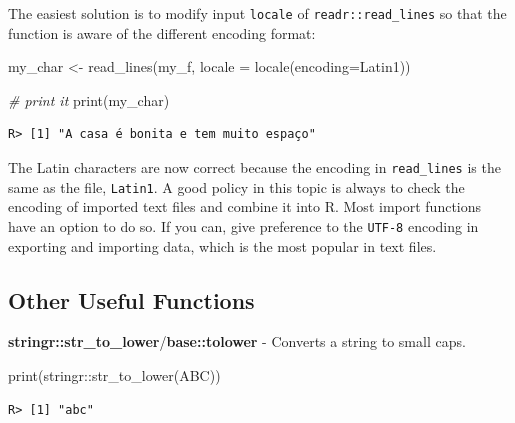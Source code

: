 \documentclass[
  12pt,
]{book}
\newenvironment{Shaded}{\begin{snugshade}}{\end{snugshade}}
\newcommand{\AttributeTok}[1]{\textcolor[rgb]{0.61,0.61,0.61}{#1}}
\newcommand{\CommentTok}[1]{\textcolor[rgb]{0.37,0.37,0.37}{\textit{#1}}}
\newcommand{\FunctionTok}[1]{\textcolor[rgb]{0,0,0}{#1}}
\newcommand{\NormalTok}[1]{#1}
\newcommand{\OtherTok}[1]{\textcolor[rgb]{0.37,0.37,0.37}{#1}}
\newcommand{\SpecialCharTok}[1]{\textcolor[rgb]{0,0,0}{#1}}
\newcommand{\StringTok}[1]{\textcolor[rgb]{0.5,0.5,0.5}{#1}}
\begin{document}
The easiest solution is to modify input \texttt{locale} of \texttt{readr::read\_lines} so that the function is aware of the different encoding format:

\begin{Shaded}
\begin{Highlighting}[]
\NormalTok{my\_char }\OtherTok{\textless{}{-}} \FunctionTok{read\_lines}\NormalTok{(my\_f, }
                      \AttributeTok{locale =} \FunctionTok{locale}\NormalTok{(}\AttributeTok{encoding=}\StringTok{\textquotesingle{}Latin1\textquotesingle{}}\NormalTok{))}

\CommentTok{\# print it}
\FunctionTok{print}\NormalTok{(my\_char)}
\end{Highlighting}
\end{Shaded}

\begin{verbatim}
R> [1] "A casa é bonita e tem muito espaço"
\end{verbatim}

The Latin characters are now correct because the encoding in \texttt{read\_lines} is the same as the file, \texttt{\textquotesingle{}Latin1\textquotesingle{}}. A good policy in this topic is always to check the encoding of imported text files and combine it into R. Most import functions have an option to do so. If you can, give preference to the \texttt{\textquotesingle{}UTF-8\textquotesingle{}} encoding in exporting and importing data, which is the most popular in text files.

\hypertarget{other-useful-functions-3}{%
\subsection{Other Useful Functions}\label{other-useful-functions-3}}

\textbf{stringr::str\_to\_lower}/\textbf{base::tolower} - Converts a string to small caps.

\begin{Shaded}
\begin{Highlighting}[]
\FunctionTok{print}\NormalTok{(stringr}\SpecialCharTok{::}\FunctionTok{str\_to\_lower}\NormalTok{(}\StringTok{\textquotesingle{}ABC\textquotesingle{}}\NormalTok{))}
\end{Highlighting}
\end{Shaded}

\begin{verbatim}
R> [1] "abc"
\end{verbatim}
\end{document}
